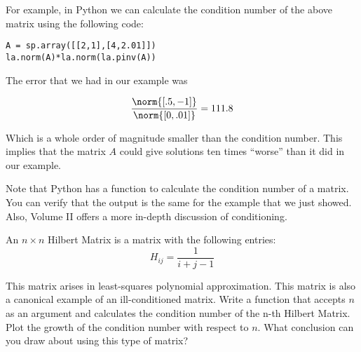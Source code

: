 For example, in Python we can calculate the condition number of the above matrix using the following code:


\begin{lstlisting}
A = sp.array([[2,1],[4,2.01]])
la.norm(A)*la.norm(la.pinv(A))
\end{lstlisting}

The error that we had in our example was

\[
\frac{\norm{[.5, -1]}}{\norm{[0, .01]}} = 111.8
\]

Which is a whole order of magnitude smaller than the condition number. This implies that the matrix $A$ could give solutions ten times ``worse'' than it did in our example.

Note that Python has a  function to calculate the condition number of a matrix. You can verify that the output is the same for the example that we just showed. Also, Volume II offers a more in-depth discussion of conditioning.

\begin{problem}
An $n \times n$ Hilbert Matrix is a matrix with the following entries:
\[
H_{ij} = \frac{1}{i + j -1}
\]

This matrix arises in least-squares polynomial approximation. This matrix is also a canonical example of an ill-conditioned matrix. Write a function that accepts $n$ as an argument and calculates the condition number of the n-th Hilbert Matrix. Plot the growth of the condition number with respect to $n$. What conclusion can you draw about using this type of matrix? %
\end{problem}